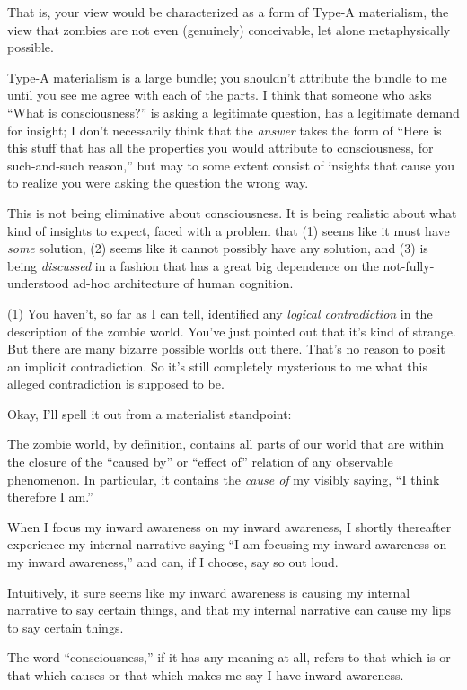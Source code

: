 {
 That is, your view would be characterized as a form of Type-A
materialism, the view that zombies are not even (genuinely)
conceivable, let alone metaphysically possible.}

{
 Type-A materialism is a large bundle; you
shouldn't attribute the bundle to me until you see me
agree with each of the parts. I think that someone who asks
``What is consciousness?'' is asking
a legitimate question, has a legitimate demand for insight; I
don't necessarily think that the \textit{answer} takes
the form of ``Here is this stuff that has all the
properties you would attribute to consciousness, for such-and-such
reason,'' but may to some extent consist of insights
that cause you to realize you were asking the question the wrong way.}

{
 This is not being eliminative about consciousness. It is being
realistic about what kind of insights to expect, faced with a problem
that (1) seems like it must have \textit{some} solution, (2) seems like
it cannot possibly have any solution, and (3) is being
\textit{discussed} in a fashion that has a great big dependence on the
not-fully-understood ad-hoc architecture of human cognition.}

{
 (1) You haven't, so far as I can tell, identified
any \textit{logical contradiction} in the description of the zombie
world. You've just pointed out that
it's kind of strange. But there are many bizarre
possible worlds out there. That's no reason to posit an
implicit contradiction. So it's still completely
mysterious to me what this alleged contradiction is supposed to be.}

{
 Okay, I'll spell it out from a materialist
standpoint:}

{
 The zombie world, by definition, contains all parts of our world
that are within the closure of the ``caused
by'' or ``effect
of'' relation of any observable phenomenon. In
particular, it contains the \textit{cause of} my visibly saying,
``I think therefore I am.''}

{
 When I focus my inward awareness on my inward awareness, I shortly
thereafter experience my internal narrative saying ``I
am focusing my inward awareness on my inward
awareness,'' and can, if I choose, say so out loud.}

{
 Intuitively, it sure seems like my inward awareness is causing my
internal narrative to say certain things, and that my internal
narrative can cause my lips to say certain things.}

{
 The word ``consciousness,'' if
it has any meaning at all, refers to that-which-is or that-which-causes
or that-which-makes-me-say-I-have inward awareness.}


